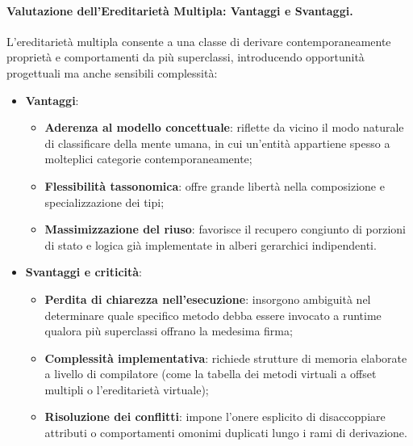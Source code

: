 \documentclass[12pt]{extarticle}
\begin{document}
\paragraph{Valutazione dell'Ereditariet\`a Multipla: Vantaggi e Svantaggi.}
L'ereditariet\`a multipla consente a una classe di derivare contemporaneamente propriet\`a e comportamenti da pi\`u superclassi, introducendo opportunit\`a progettuali ma anche sensibili complessit\`a:
\begin{itemize}
    \item \textbf{Vantaggi}:
    \begin{itemize}
        \item \textbf{Aderenza al modello concettuale}: riflette da vicino il modo naturale di classificare della mente umana, in cui un'entit\`a appartiene spesso a molteplici categorie contemporaneamente;
        \item \textbf{Flessibilit\`a tassonomica}: offre grande libert\`a nella composizione e specializzazione dei tipi;
        \item \textbf{Massimizzazione del riuso}: favorisce il recupero congiunto di porzioni di stato e logica gi\`a implementate in alberi gerarchici indipendenti.
    \end{itemize}
    \item \textbf{Svantaggi e criticit\`a}:
    \begin{itemize}
        \item \textbf{Perdita di chiarezza nell'esecuzione}: insorgono ambiguit\`a nel determinare quale specifico metodo debba essere invocato a runtime qualora pi\`u superclassi offrano la medesima firma;
        \item \textbf{Complessit\`a implementativa}: richiede strutture di memoria elaborate a livello di compilatore (come la tabella dei metodi virtuali a offset multipli o l'ereditariet\`a virtuale);
        \item \textbf{Risoluzione dei conflitti}: impone l'onere esplicito di disaccoppiare attributi o comportamenti omonimi duplicati lungo i rami di derivazione.
    \end{itemize}
\end{itemize}
\end{document}
